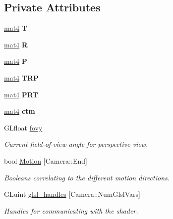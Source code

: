 \subsection*{Private Attributes}
\begin{DoxyCompactItemize}
\item 
\hypertarget{class_camera_aa4cb92b539c9a9707a12d7025ed889f6}{\hyperlink{class_angel_1_1mat4}{mat4} {\bfseries T}}\label{class_camera_aa4cb92b539c9a9707a12d7025ed889f6}

\item 
\hypertarget{class_camera_a8fd028120b18556c43ad86756e637fbc}{\hyperlink{class_angel_1_1mat4}{mat4} {\bfseries R}}\label{class_camera_a8fd028120b18556c43ad86756e637fbc}

\item 
\hypertarget{class_camera_a0bee6fbae6ec5960850a5fb858f3912a}{\hyperlink{class_angel_1_1mat4}{mat4} {\bfseries P}}\label{class_camera_a0bee6fbae6ec5960850a5fb858f3912a}

\item 
\hypertarget{class_camera_a2ec15fbfe495b11f60b68726d5a22bb9}{\hyperlink{class_angel_1_1mat4}{mat4} {\bfseries T\-R\-P}}\label{class_camera_a2ec15fbfe495b11f60b68726d5a22bb9}

\item 
\hypertarget{class_camera_a6f5bb6e124f8e4bbfd163a2cb2f505dd}{\hyperlink{class_angel_1_1mat4}{mat4} {\bfseries P\-R\-T}}\label{class_camera_a6f5bb6e124f8e4bbfd163a2cb2f505dd}

\item 
\hypertarget{class_camera_a9b1e81e3f5531390bb6a599dca0d2444}{\hyperlink{class_angel_1_1mat4}{mat4} {\bfseries ctm}}\label{class_camera_a9b1e81e3f5531390bb6a599dca0d2444}

\item 
G\-Lfloat \hyperlink{class_camera_acc8b97facc57059530efad534c2f8314}{fovy}
\begin{DoxyCompactList}\small\item\em Current field-\/of-\/view angle for perspective view. \end{DoxyCompactList}\item 
bool \hyperlink{class_camera_a39746b4fadf30bba6bdc8aa6acfdc6f2}{Motion} \mbox{[}Camera\-::\-End\mbox{]}
\begin{DoxyCompactList}\small\item\em Booleans correlating to the different motion directions. \end{DoxyCompactList}\item 
G\-Luint \hyperlink{class_camera_a1635486d7f9e0d52b241899a270ee335}{glsl\-\_\-handles} \mbox{[}Camera\-::\-Num\-Glsl\-Vars\mbox{]}
\begin{DoxyCompactList}\small\item\em Handles for communicating with the shader. \end{DoxyCompactList}\end{DoxyCompactItemize}


